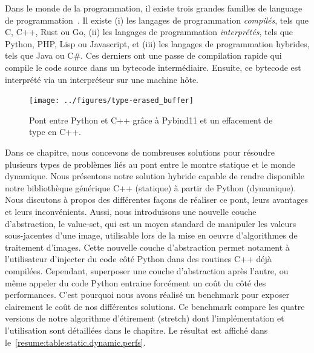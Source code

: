 Dans le monde de la programmation, il existe trois grandes familles de language de
programmation~\parencite{prechelt.2000.comparison}. Il existe (i) les langages de programmation \emph{compilés}, tels
que C, C++, Rust ou Go, (ii) les langages de programmation \emph{interprétés}, tels que Python, PHP, Lisp ou Javascript,
et (iii) les langages de programmation hybrides, tels que Java ou C\#. Ces derniers ont une passe de compilation rapide
qui compile le code source dans un bytecode intermédiaire. Ensuite, ce bytecode est interprété via un interpréteur sur
une machine hôte.

\begin{figure}[htbp]
  \centering
  \texttt{[image: ../figures/type-erased\_buffer]}
  \caption[]{Pont entre Python et C++ grâce à Pybind11 et un effacement de type en C++.}
  \label{resume:fig:type-erased.buffer}
\end{figure}

Dans ce chapitre, nous concevons de nombreuses solutions pour résoudre plusieurs types de problèmes liés au pont entre
le montre statique et le monde dynamique. Nous présentons notre solution hybride capable de rendre disponible notre
bibliothèque générique C++ (statique) à partir de Python (dynamique). Nous discutons à propos des différentes façons de
réaliser ce pont, leurs avantages et leurs inconvénients. Aussi, nous introduisons une nouvelle couche d'abstraction, le
value-set, qui est un moyen standard de manipuler les valeurs sous-jacentes d'une image, utilisable lors de la mise en
oeuvre d'algorithmes de traitement d'images. Cette nouvelle couche d'abstraction permet notament à l'utilisateur
d'injecter du code côté Python dans des routines C++ déjà compilées. Cependant, superposer une couche d'abstraction
après l'autre, ou même appeler du code Python entraine forcément un coût du côté des performances. C'est pourquoi nous
avons réalisé un benchmark pour exposer clairement le coût de nos différentes solutions. Ce benchmark compare les quatre
versions de notre algorithme d'étirement (stretch) dont l'implémentation et l'utilisation sont détaillées dans le
chapitre. Le résultat est affiché dans le~\cref{resume:table:static.dynamic.perfs}.


